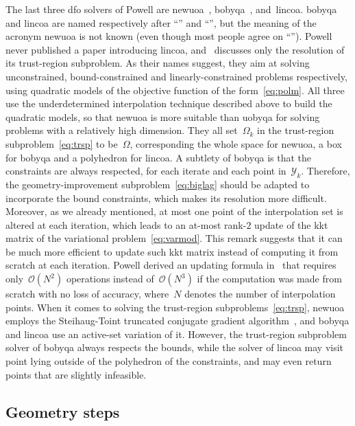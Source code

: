 \documentclass[11pt,draft]{article}
\numberwithin{equation}{section}
\newcommand\srchspmdl[1][k]{\Omega_{#1}}
\newcommand\itpls[1][k]{\mathcal{Y}_{#1}}
\begin{document}
The last three \gls{dfo} solvers of Powell are \gls{newuoa}~\cite{Powell_2006, Powell_2008},
\gls{bobyqa}~\cite{Powell_2009}, and~\gls{lincoa}.
\Gls{bobyqa} and \gls{lincoa} are named respectively after \enquote{} and \enquote{}, but the meaning of the acronym \gls{newuoa} is not known (even though most people agree on \enquote{}).
Powell never published a paper introducing \gls{lincoa}, and~\cite{Powell_2015} discusses only the resolution of its trust-region subproblem.
As their names suggest, they aim at solving unconstrained, bound-constrained and linearly-constrained problems respectively, using quadratic models of the objective function of the form~\eqref{eq:polm}.
All three use the underdetermined interpolation technique described above to build the quadratic models, so that \gls{newuoa} is more suitable than \gls{uobyqa} for solving problems with a relatively high dimension.
They all set~$\srchspmdl$ in the trust-region subproblem~\eqref{eq:trsp} to be~$\Omega$, corresponding the whole space for \gls{newuoa}, a box for \gls{bobyqa} and a polyhedron for \gls{lincoa}.
A subtlety of \gls{bobyqa} is that the constraints are always respected, for each iterate and each point in~$\itpls$.
Therefore, the geometry-improvement subproblem~\eqref{eq:biglag} should be adapted to incorporate the bound constraints, which makes its resolution more difficult.
Moreover, as we already mentioned, at most one point of the interpolation set is altered at each iteration, which leads to an at-most rank-$2$ update of the \gls{kkt} matrix of the variational problem~\eqref{eq:varmod}.
This remark suggests that it can be much more efficient to update such \gls{kkt} matrix instead of computing it from scratch at each iteration.
Powell derived an updating formula in~\cite{Powell_2004b} that requires only~$\mathcal{O}(N^2)$ operations instead of~$\mathcal{O}(N^3)$ if the computation was made from scratch with no loss of accuracy, where~$N$ denotes the number of interpolation points.
When it comes to solving the trust-region subproblems~\eqref{eq:trsp}, \gls{newuoa} employs the Steihaug-Toint truncated conjugate gradient algorithm~\cite{Steihaug_1983, Toint_1981}, and \gls{bobyqa} and \gls{lincoa} use an active-set variation of it.
However, the trust-region subproblem solver of \gls{bobyqa} always respects the bounds, while the solver of \gls{lincoa} may visit point lying outside of the polyhedron of the constraints, and may even return points that are slightly infeasible.


\subsection{Geometry steps}
\end{document}
